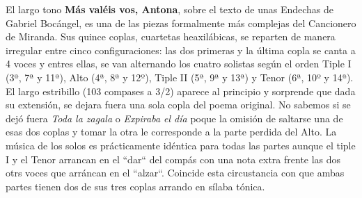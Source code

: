 El largo tono \textbf{Más valéis vos, Antona}, sobre el texto de unas Endechas de Gabriel Bocángel, es una de las piezas formalmente más complejas del Cancionero de Miranda. Sus quince coplas, cuartetas heaxilábicas, se reparten de manera irregular entre cinco configuraciones: las dos primeras y la última copla se canta a 4 voces y entres ellas, se van alternando los cuatro solistas según el orden Tiple I (3ª, 7ª y 11ª), Alto (4ª, 8ª y 12º), Tiple II (5ª, 9ª y 13ª) y Tenor (6ª, 10º y 14ª). El largo estribillo (103 compases a 3/2) aparece al principio y sorprende que dada su extensión, se dejara fuera una sola copla del poema original. No sabemos si se dejó fuera \textit{Toda la zagala} o \textit{Expiraba el día} poque la omisión de saltarse una de esas dos coplas y tomar la otra le corresponde a la parte perdida del Alto. La música de los solos es prácticamente idéntica para todas las partes aunque el tiple I y el Tenor arrancan en el ``dar`` del compás con una nota extra frente las dos otrs voces que arráncan en el ``alzar``. Coincide esta circustancia con que ambas partes tienen dos de sus tres coplas arrando en sílaba tónica.





